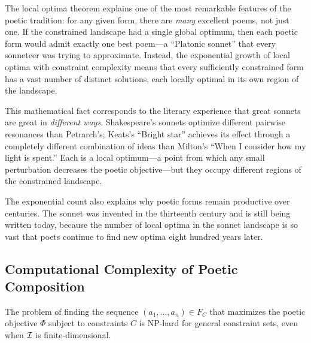 \begin{interpretation}
\label{interp:local-optima}
The local optima theorem explains one of the most remarkable features of the
poetic tradition: for any given form, there are \emph{many} excellent poems,
not just one.  If the constrained landscape had a single global optimum, then
each poetic form would admit exactly one best poem---a ``Platonic sonnet'' that
every sonneteer was trying to approximate.  Instead, the exponential growth
of local optima with constraint complexity means that every sufficiently
constrained form has a vast number of distinct solutions, each locally optimal
in its own region of the landscape.

This mathematical fact corresponds to the literary experience that great
sonnets are great in \emph{different ways}.  Shakespeare's sonnets optimize
different pairwise resonances than Petrarch's; Keats's ``Bright star'' achieves
its effect through a completely different combination of ideas than Milton's
``When I consider how my light is spent.''  Each is a local optimum---a point
from which any small perturbation decreases the poetic objective---but they
occupy different regions of the constrained landscape.

The exponential count also explains why poetic forms remain productive over
centuries.  The sonnet was invented in the thirteenth century and is still being
written today, because the number of local optima in the sonnet landscape is
so vast that poets continue to find new optima eight hundred years later.
\end{interpretation}




\subsection{Computational Complexity of Poetic Composition}

\begin{theorem}
\label{thm:hardness-poetry}
The problem of finding the sequence $(a_1, \ldots, a_n) \in F_C$ that
maximizes the poetic objective $\Phi$ subject to constraints $C$ is
NP-hard for general constraint sets, even when $\mathcal{I}$ is finite-dimensional.
\end{theorem}

